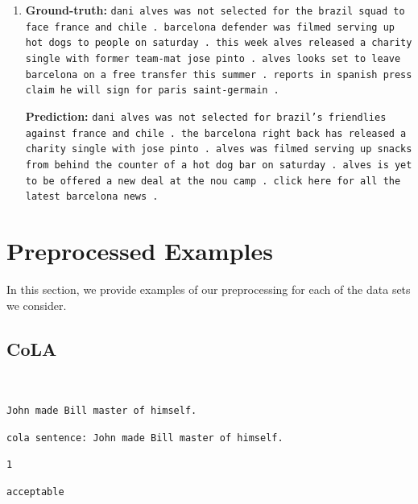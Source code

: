 \documentclass[twoside,11pt]{article}
\begin{document}
\begin{enumerate}
\item \textbf{Ground-truth:} \texttt{dani alves was not selected for the brazil squad to face france and chile . barcelona defender was filmed serving up hot dogs to people on saturday . this week alves released a charity single with former team-mat jose pinto . alves looks set to leave barcelona on a free transfer this summer . reports in spanish press claim he will sign for paris saint-germain .}

\textbf{Prediction:} \texttt{dani alves was not selected for brazil's friendlies against france and chile . the barcelona right back has released a charity single with jose pinto . alves was filmed serving up snacks from behind the counter of a hot dog bar on saturday . alves is yet to be offered a new deal at the nou camp . click here for all the latest barcelona news .}

\end{enumerate}

\section{Preprocessed Examples}
\label{sec:preprocessing}

In this section, we provide examples of our preprocessing for each of the data sets we consider.

\subsection{CoLA}
\begin{description}[leftmargin=0.5cm]
\item[Original input:] ~
\begin{description}[leftmargin=0.5cm]
  \item[Sentence:] \texttt{John made Bill master of himself.}
\end{description}
\item[Processed input:] \texttt{cola sentence:\ John made Bill master of himself.}
\item[Original target:] \texttt{1}
\item[Processed target:] \texttt{acceptable}
\end{description}
\end{document}

